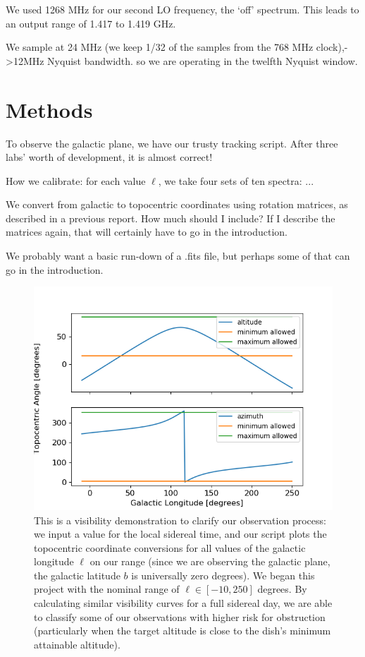 \documentclass[12pt]{article}
\begin{document}
We used 1268 MHz for our second LO frequency, the `off' spectrum. This leads to an output range of 1.417 to 1.419 GHz.

We sample at 24 MHz (we keep 1/32 of the samples from the 768 MHz clock),->12MHz Nyquist bandwidth. so we are operating in the twelfth Nyquist window.

\section{Methods}

\quad \quad To observe the galactic plane, we have our trusty tracking script. After three labs' worth of development, it is almost correct!

How we calibrate: for each value $\ell$, we take four sets of ten spectra: ...

We convert from galactic to topocentric coordinates using rotation matrices, as described in a previous report. How much should I include? If I describe the matrices again, that will certainly have to go in the introduction.

We probably want a basic run-down of a .fits file, but perhaps some of that can go in the introduction.

\begin{figure}
	\centering
	\includegraphics[width=.9\linewidth]{1940_10_05_2020}
	\caption{This is a visibility demonstration to clarify our observation process: we input a value for the local sidereal time, and our script plots the topocentric coordinate conversions for all values of the galactic longitude $\ell$ on our range (since we are observing the galactic plane, the galactic latitude $b$ is universally zero degrees). We began this project with the nominal range of $\ell \in [-10, 250]$ degrees. By calculating similar visibility curves for a full sidereal day, we are able to classify some of our observations with higher risk for obstruction (particularly when the target altitude is close to the dish's minimum attainable altitude).}
	\label{fig:vis_demo}
\end{figure}
\end{document}

